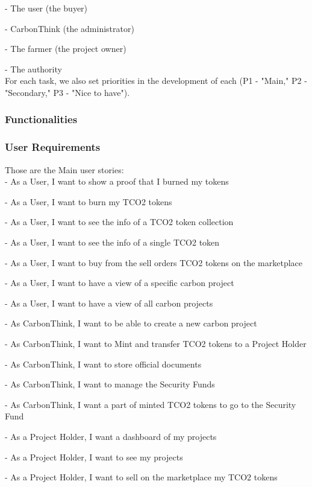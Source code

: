 \documentclass[a4paper, 12pt]{article}
\begin{document}
- The user (the buyer)

- CarbonThink (the administrator)

- The farmer (the project owner)

- The authority\\

For each task, we also set priorities in the development of each (P1 - "Main," P2 - "Secondary," P3 - "Nice to have").

\subsubsection{Functionalities}

\subsubsection{User Requirements}

Those are the Main user stories:\\

- As a User, I want to show a proof that I burned my tokens

- As a User, I want to burn my TCO2 tokens

- As a User, I want to see the info of a TCO2 token collection

- As a User, I want to see the info of a single TCO2 token

- As a User, I want to buy from the sell orders TCO2 tokens on the marketplace

- As a User, I want to have a view of a specific carbon project

- As a User, I want to have a view of all carbon projects

- As CarbonThink, I want to be able to create a new carbon project

- As CarbonThink, I want to Mint and transfer TCO2 tokens to a Project Holder

- As CarbonThink, I want to store official documents

- As CarbonThink, I want to manage the Security Funds

- As CarbonThink, I want a part of minted TCO2 tokens to go to the Security Fund

- As a Project Holder, I want a dashboard of my projects

- As a Project Holder, I want to see my projects

- As a Project Holder, I want to sell on the marketplace my TCO2 tokens \\
\end{document}
